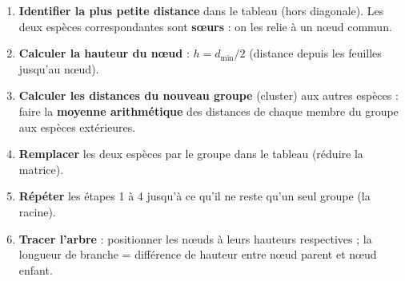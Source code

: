 \documentclass[11pt]{article}
\begin{document}
\begin{methode}
\begin{enumerate}
    \item \textbf{Identifier la plus petite distance} dans le tableau (hors diagonale). Les deux espèces correspondantes sont \textbf{sœurs} : on les relie à un nœud commun.
    \item \textbf{Calculer la hauteur du nœud} : $h = d_{\min} / 2$ (distance depuis les feuilles jusqu'au nœud).
    \item \textbf{Calculer les distances du nouveau groupe} (cluster) aux autres espèces : faire la \textbf{moyenne arithmétique} des distances de chaque membre du groupe aux espèces extérieures.
    \item \textbf{Remplacer} les deux espèces par le groupe dans le tableau (réduire la matrice).
    \item \textbf{Répéter} les étapes 1 à 4 jusqu'à ce qu'il ne reste qu'un seul groupe (la racine).
    \item \textbf{Tracer l'arbre} : positionner les nœuds à leurs hauteurs respectives ; la longueur de branche = différence de hauteur entre nœud parent et nœud enfant.
\end{enumerate}
\end{methode}
\end{document}
